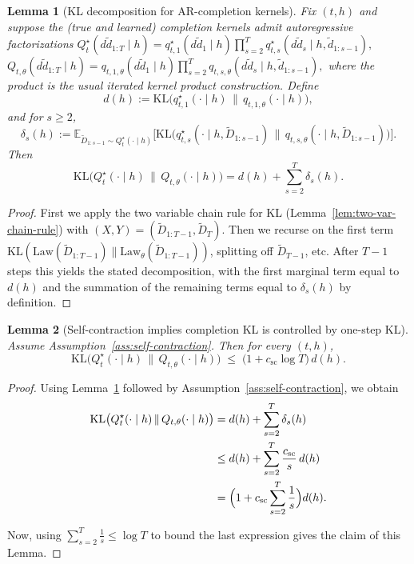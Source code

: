 \documentclass[11pt]{article}
\newtheorem{lemma}{Lemma}
\begin{document}
\begin{lemma}[KL decomposition for AR-completion kernels]\label{lem:AR-KL-decomp}
Fix $(t,h)$ and suppose the (true and learned) completion kernels admit autoregressive factorizations
\(
Q^\star_t(d\tilde d_{1:T}\mid h) = q^\star_{t,1}(d\tilde d_1\mid h)\prod_{s=2}^T q^\star_{t,s}(d\tilde d_s\mid h,\tilde d_{1:s-1}),
\)
\(
Q_{t,\theta}(d\tilde d_{1:T}\mid h) = q_{t,1,\theta}(d\tilde d_1\mid h)\prod_{s=2}^T q_{t,s,\theta}(d\tilde d_s\mid h,\tilde d_{1:s-1}),
\)
where the product is the usual iterated kernel product construction.
Define
\begin{equation}\label{eq:def-dh}
d(h) := \mathrm{KL}\big(q^\star_{t,1}(\cdot\mid h)\,\|\,q_{t,1,\theta}(\cdot\mid h)\big),
\end{equation}
and for $s\ge 2$,
\begin{equation}\label{eq:def-delta-sh}
\delta_s(h)
:= \mathbb{E}_{\tilde D_{1:s-1}\sim Q^\star_t(\cdot\mid h)}
\Big[
\mathrm{KL}\big(q^\star_{t,s}(\cdot\mid h,\tilde D_{1:s-1})\,\|\,q_{t,s,\theta}(\cdot\mid h,\tilde D_{1:s-1})\big)
\Big].
\end{equation}
Then
\[
\mathrm{KL}\big(Q^\star_t(\cdot\mid h)\,\|\,Q_{t,\theta}(\cdot\mid h)\big)
=
d(h) + \sum_{s=2}^T \delta_s(h).
\]
\end{lemma}

\begin{proof}
First we apply the two variable chain rule for KL (Lemma~\ref{lem:two-var-chain-rule}) with $(X,Y)=(\tilde D_{1:T-1},\tilde D_T)$. Then we recurse on the first term
$\mathrm{KL}(\mathrm{Law}(\tilde D_{1:T-1})\|\mathrm{Law}_\theta(\tilde D_{1:T-1}))$, splitting off $\tilde D_{T-1}$, etc.
After $T-1$ steps this yields the stated decomposition, with the first marginal term equal to $d(h)$ and the summation of the remaining terms equal to $\delta_s(h)$ by definition.
\end{proof}

\begin{lemma}[Self-contraction implies completion KL is controlled by one-step KL]\label{lem:self-contraction-bound}
Assume Assumption~\ref{ass:self-contraction}. Then for every $(t,h)$,
\[
\mathrm{KL}\big(Q^\star_t(\cdot\mid h)\,\|\,Q_{t,\theta}(\cdot\mid h)\big)
\;\le\;
\bigl(1 + c_{\mathrm{sc}}\log T\bigr)\, d(h).
\]
\end{lemma}

\begin{proof}
Using Lemma~\ref{lem:AR-KL-decomp} followed by Assumption~\ref{ass:self-contraction}, we obtain
\begin{align*}
\mathrm{KL}\big(Q^\star_t(\cdot\mid h)\,\|\,Q_{t,\theta}(\cdot\mid h)\big) 
&= d(h) + \sum_{s=2}^T \delta_s(h) \\
&\le d(h) + \sum_{s=2}^T \frac{c_{\mathrm{sc}}}{s}\, d(h) \\
&= \Bigl(1 + c_{\mathrm{sc}}\sum_{s=2}^T \frac{1}{s}\Bigr) d(h).
\end{align*}

Now, using $\sum_{s=2}^T \frac{1}{s} \le \log T$ to bound the last expression gives the claim of this Lemma.
\end{proof}
\end{document}
